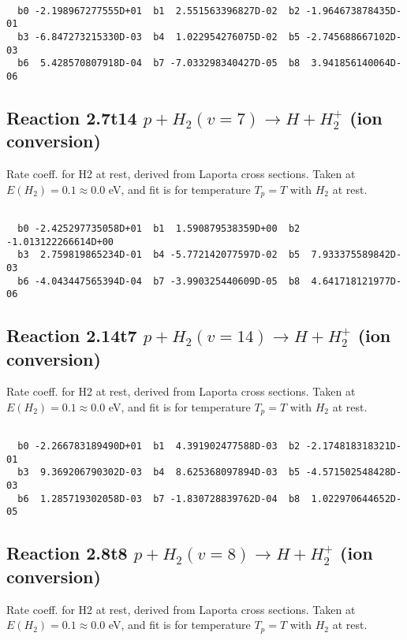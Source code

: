 \begin{small}\begin{verbatim}

  b0 -2.198967277555D+01  b1  2.551563396827D-02  b2 -1.964673878435D-01
  b3 -6.847273215330D-03  b4  1.022954276075D-02  b5 -2.745688667102D-03
  b6  5.428570807918D-04  b7 -7.033298340427D-05  b8  3.941856140064D-06

\end{verbatim}\end{small}

\newpage
\subsection{
Reaction 2.7t14
$ p + H_2(v=7) \rightarrow H + H_2^+$ (ion conversion)
}
Rate coeff. for H2 at rest, derived from Laporta cross sections.
Taken at $E(H_2) = 0.1 \approx 0.0$ eV,  and fit is for temperature $T_p=T$ with $H_2$ at rest.

\begin{small}\begin{verbatim}

  b0 -2.425297735058D+01  b1  1.590879538359D+00  b2 -1.013122266614D+00
  b3  2.759819865234D-01  b4 -5.772142077597D-02  b5  7.933375589842D-03
  b6 -4.043447565394D-04  b7 -3.990325440609D-05  b8  4.641718121977D-06

\end{verbatim}\end{small}

\newpage
\subsection{
Reaction 2.14t7
$ p + H_2(v=14) \rightarrow H + H_2^+$ (ion conversion)
}
Rate coeff. for H2 at rest, derived from Laporta cross sections.
Taken at $E(H_2) = 0.1 \approx 0.0$ eV,  and fit is for temperature $T_p=T$ with $H_2$ at rest.

\begin{small}\begin{verbatim}

  b0 -2.266783189490D+01  b1  4.391902477588D-03  b2 -2.174818318321D-01
  b3  9.369206790302D-03  b4  8.625368097894D-03  b5 -4.571502548428D-03
  b6  1.285719302058D-03  b7 -1.830728839762D-04  b8  1.022970644652D-05

\end{verbatim}\end{small}

\newpage
\subsection{
Reaction 2.8t8
$ p + H_2(v=8) \rightarrow H + H_2^+$ (ion conversion)
}
Rate coeff. for H2 at rest, derived from Laporta cross sections.
Taken at $E(H_2) = 0.1 \approx 0.0$ eV,  and fit is for temperature $T_p=T$ with $H_2$ at rest.

